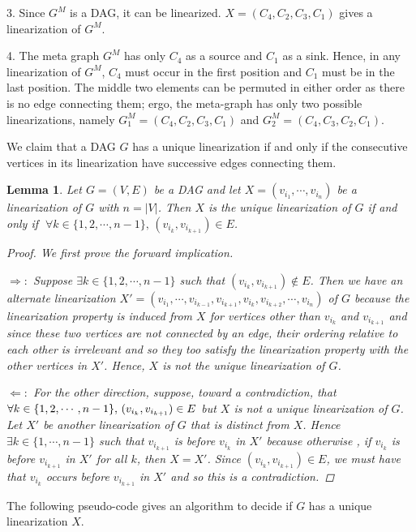 \documentclass[tikz, letterpaper,12pt]{article}
\newcounter{problemid}\stepcounter{problemid}
\def\newproblem{\vspace*{0.01cm}{\bf Problem~\arabic{problemid}\stepcounter{problemid}}\hfill\fbox{\parbox{0.16\textwidth}{\bf Points:}}\par}
\newtheorem{lemma}{Lemma}
\begin{document}
3. Since $G^M$ is a DAG, it can be linearized. $X=(C_4,C_2,C_3,C_1)$ gives a linearization of $G^M$.

4. The meta graph $G^M$ has only $C_4$ as a source and $C_1$ as a sink. Hence, in any linearization of $G^M$, $C_4$ must occur in the first position and $C_1$ must be in the last position. The middle two elements can be permuted in either order as there is no edge connecting them; ergo, the meta-graph has only two possible linearizations, namely $G^M_1=(C_4,C_2,C_3,C_1)$ and $G^M_2=(C_4,C_3,C_2,C_1)$.

\newproblem
We claim that a DAG $G$ has a unique linearization if and only if the consecutive vertices in its linearization have successive edges connecting them.
\begin{lemma}
Let $G=(V,E)$ be a DAG and let $X=(v_{i_1},\cdots,v_{i_n})$ be a linearization of $G$ with $n=|V|$. Then $X$ is the unique linearization of $G$ if and only if $\;\forall k\in\{1,2,\cdots,n-1\},\, (v_{i_k},v_{i_{k+1}})\in E$.
\begin{proof}
We first prove the forward implication.

$\Longrightarrow :$
Suppose $\exists k\in\{1,2,\cdots,n-1\}$ such that $(v_{i_k},v_{i_{k+1}})\notin E$.
Then we have an alternate linearization $X'=(v_{i_1},\cdots,v_{i_{k-1}},v_{i_{k+1}},v_{i_k},v_{i_{k+2}},\cdots,v_{i_n})$ of $G$ because the linearization property is induced from $X$ for vertices other than $v_{i_k}$ and $v_{i_{k+1}}$ and since these two vertices are not connected by an edge, their ordering relative to each other is irrelevant and so they too satisfy the linearization property with the other vertices in $X'$. Hence, $X$ is not the unique linearization of $G$.

$\Longleftarrow :$ For the other direction, suppose, toward a contradiction, that $\forall k\in\{1,2,\cdots,n-1\},\, (v_{i_k},v_{i_{k+1}})\\\in E$ but $X$ is not a unique linearization of $G$. Let $X'$ be another linearization of $G$ that is distinct from $X$. Hence $\exists k\in\{1,\cdots,n-1\}$ such that $v_{i_{k+1}}$ is before $v_{i_k}$ in $X'$ because otherwise , if $v_{i_k}$ is before $v_{i_{k+1}}$ in $X'$ for all $k$, then $X=X'$. Since $(v_{i_k},v_{i_{k+1}})\in E$, we must have that $v_{i_k}$ occurs before $v_{i_{k+1}}$ in $X'$ and so this is a contradiction.
\end{proof}
\end{lemma}

The following pseudo-code gives an algorithm to decide if $G$ has a unique linearization $X$.
\end{document}
